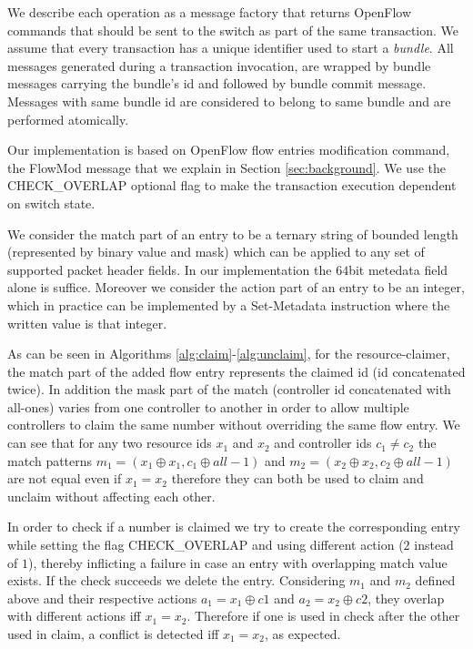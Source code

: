 \documentclass[conference]{sigcomm-alternate}
\newcommand{\concat}[0]{\oplus}
\newcommand{\claimcheck}{check\xspace}
\begin{document}
We describe each operation as a message factory that returns OpenFlow commands that should be sent to the switch as part of the same transaction.
We assume that every transaction has a unique identifier  used to start a \emph{bundle}.
All messages generated during a transaction invocation, are wrapped by bundle messages carrying the bundle's id and followed by bundle commit message.
Messages with same bundle id are considered to belong to same bundle and are performed atomically.



Our implementation is based on OpenFlow flow entries modification command, the FlowMod message that we explain in Section \ref{sec:background}. We use the CHECK\_OVERLAP optional flag to make the transaction execution dependent on switch state.

We consider the match part of an entry to be a ternary string of bounded length (represented by binary value and mask) which can be applied to any set of supported packet header fields. In our implementation the $64$bit metedata field alone is suffice. Moreover we consider the action part of an entry to be an integer, which in practice can be implemented by a Set-Metadata instruction where the written value is that integer.

 As can be seen in Algorithms \ref{alg:claim}-\ref{alg:unclaim}, for the resource-claimer,
  the match part of the added flow entry represents the claimed id (id concatenated twice).
   In addition the mask part of the match (controller id concatenated with all-ones) varies from one controller to another in order to allow multiple controllers to claim the same number without overriding the same flow entry.
    We can see that for any two resource ids $x_1$ and $x_2$ and controller ids $c_1\neq c_2$ the match patterns $m_1=(x_1\concat x_1, c_1\concat all-1)$ and $ m_2=(x_2\concat x_2, c_2\concat all-1)$ are not equal even if $x_1=x_2$ therefore they can both be used to claim and unclaim without affecting each other.

In order to check if a number is claimed we try to create the corresponding entry while setting the
flag \textsf{CHECK\_OVERLAP} and using different action ($2$ instead of $1$), thereby inflicting a failure in case an entry with overlapping match value exists. If the check succeeds we delete the entry. Considering $m_1$ and $m_2$ defined above and their respective actions $a_1=x_1\concat c1$ and $a_2=x_2\concat c2$,  they overlap with different actions iff $x_1=x_2$. Therefore if one is used in \claimcheck after the other used in claim, a conflict is detected iff $x_1=x_2$, as expected.
\end{document}
